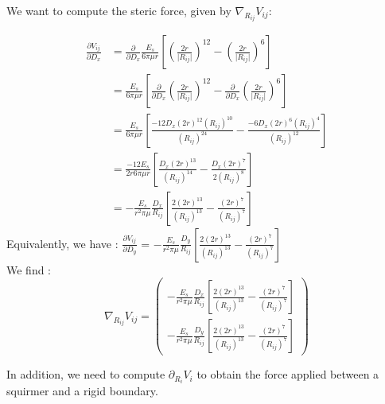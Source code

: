 \documentclass{article}
\begin{document}
\vspace{0,5cm}
We want to compute the steric force, given by $\nabla_{R_{ij}} V_{ij}$:

\begin{align*}
\frac{\partial V_{ij}}{\partial D_x} &= \frac{\partial}{\partial D_x}\frac{E_s}{6\pi\mu r}\left[\left(\frac{2r}{\lvert R_{ij}\rvert}\right)^{12} - \left(\frac{2r}{\lvert R_{ij}\rvert}\right)^6\right] \\
&= \frac{E_s}{6\pi\mu r} \left[\frac{\partial}{\partial D_x}\left(\frac{2r}{\lvert R_{ij}\rvert}\right)^{12} - \frac{\partial}{\partial D_x} \left(\frac{2r}{\lvert R_{ij}\rvert}\right)^6\right] \\
&= \frac{E_s}{6\pi\mu r} \left[ \frac{-12 D_x (2r)^{12}(R_{ij})^{10}}{(R_{ij})^{24}} - \frac{-6D_x(2r)^6(R_{ij})^4}{(R_{ij})^12}  \right] \\
&= \frac{-12 E_s}{2r6\pi\mu r} \left[ \frac{D_x (2r)^{13}}{(R_{ij})^{14}} - \frac{D_x (2r)^{7}}{2(R_{ij})^8}\right] \\
&= -\frac{E_s}{r^2\pi\mu} \frac{D_x}{R_{ij}} \left[ \frac{2(2r)^{13}}{(R_{ij})^{13}} - \frac{(2r)^7}{(R_{ij})^{7}}\right]
\end{align*}
Equivalently, we have : 
$\frac{\partial V_{ij}}{\partial D_y}$ = $-\frac{E_s}{r^2\pi\mu} \frac{D_y}{R_{ij}}\left[ \frac{2(2r)^{13}}{(R_{ij})^{13}} - \frac{(2r)^7}{(R_{ij})^7} \right]$
\\ We find : 
\begin{equation*}
    \boxed{\nabla_{R_{ij}} V_{ij} = 
    \begin{pmatrix}
        -\frac{E_s}{r^2\pi\mu} \frac{D_x}{R_{ij}}\left[ \frac{2(2r)^{13}}{(R_{ij})^{13}} - \frac{(2r)^7}{(R_{ij})^7} \right] \\
        -\frac{E_s}{r^2\pi\mu} \frac{D_y}{R_{ij}}\left[ \frac{2(2r)^{13}}{(R_{ij})^{13}} - \frac{(2r)^7}{(R_{ij})^7} \right]
    \end{pmatrix}}
\end{equation*}

\vspace{0,5cm}

In addition, we need to compute $\partial_{R_i} V_i$ to obtain the force applied between a squirmer and a rigid boundary.
\end{document}
